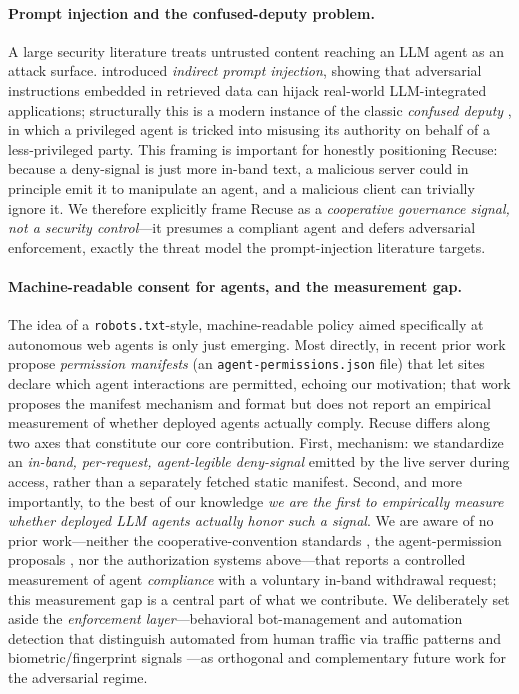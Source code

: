 \paragraph{Prompt injection and the confused-deputy problem.}
A large security literature treats untrusted content reaching an LLM agent as an
attack surface. \citet{greshake2023injection} introduced \emph{indirect prompt
injection}, showing that adversarial instructions embedded in retrieved data can
hijack real-world LLM-integrated applications; structurally this is a modern
instance of the classic \emph{confused deputy} \citep{hardy1988confused}, in
which a privileged agent is tricked into misusing its authority on behalf of a
less-privileged party. This framing is important for honestly positioning Recuse:
because a deny-signal is just more in-band text, a malicious server could in
principle emit it to manipulate an agent, and a malicious client can trivially
ignore it. We therefore explicitly frame Recuse as a \emph{cooperative governance
signal, not a security control}---it presumes a compliant agent and defers
adversarial enforcement, exactly the threat model the prompt-injection literature
targets.

\paragraph{Machine-readable consent for agents, and the measurement gap.}
The idea of a \texttt{robots.txt}-style, machine-readable policy aimed
specifically at autonomous web agents is only just emerging. Most directly, in recent prior
work \citet{marro2026permission} propose \emph{permission manifests} (an
\texttt{agent-permissions.json} file) that let sites declare which agent
interactions are permitted, echoing our motivation; that work proposes the
manifest mechanism and format but does not report an empirical measurement of
whether deployed agents actually comply. Recuse differs along two axes that
constitute our core contribution. First, mechanism: we standardize an
\emph{in-band, per-request, agent-legible deny-signal} emitted by the live server
during access, rather than a separately fetched static manifest. Second, and more
importantly, to the best of our knowledge \emph{we are the first to empirically
measure whether deployed LLM agents actually honor such a signal}. We are aware of
no prior work---neither the cooperative-convention standards
\citep{rfc9309,aipref-attach}, the agent-permission proposals
\citep{marro2026permission}, nor the authorization systems above---that reports a
controlled measurement of agent \emph{compliance} with a voluntary in-band
withdrawal request; this measurement gap is a central part of what we contribute.
We deliberately set aside the \emph{enforcement layer}---behavioral bot-management
and automation detection that distinguish automated from human traffic via
traffic patterns and biometric/fingerprint signals \citep{iliou2021bots}---as
orthogonal and complementary future work for the adversarial regime.
